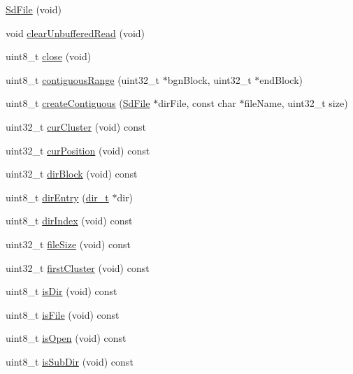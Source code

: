\begin{DoxyCompactItemize}
\item 
\hyperlink{class_sd_file_a9e08675e64a4ef847700876d4291bbef}{Sd\+File} (void)
\item 
void \hyperlink{class_sd_file_a44c3d6ef602e84b8160a4d215faef7d4}{clear\+Unbuffered\+Read} (void)
\item 
uint8\+\_\+t \hyperlink{class_sd_file_a6b24350c89cc41ff644a343231a3983c}{close} (void)
\item 
uint8\+\_\+t \hyperlink{class_sd_file_a3b07fc09dbcb28ae7c89c060af6a1810}{contiguous\+Range} (uint32\+\_\+t $\ast$bgn\+Block, uint32\+\_\+t $\ast$end\+Block)
\item 
uint8\+\_\+t \hyperlink{class_sd_file_a07fc5c82318f073848e706f95830e5b5}{create\+Contiguous} (\hyperlink{class_sd_file}{Sd\+File} $\ast$dir\+File, const char $\ast$file\+Name, uint32\+\_\+t size)
\item 
uint32\+\_\+t \hyperlink{class_sd_file_a970ef8d6cbb09ccb104fe1156d4a0a9e}{cur\+Cluster} (void) const
\item 
uint32\+\_\+t \hyperlink{class_sd_file_a6105ae2f1c23e99fdea17bc64571ea8c}{cur\+Position} (void) const
\item 
uint32\+\_\+t \hyperlink{class_sd_file_af62898865cfe9a97ce75468efc0d2409}{dir\+Block} (void) const
\item 
uint8\+\_\+t \hyperlink{class_sd_file_abaf9b1dc12d53cdeb937065edf68927d}{dir\+Entry} (\hyperlink{_fat_structs_8h_a803db59d4e16a0c54a647afc6a7954e3}{dir\+\_\+t} $\ast$dir)
\item 
uint8\+\_\+t \hyperlink{class_sd_file_ad4381e541a53a7e5cf51a866c1c8f79e}{dir\+Index} (void) const
\item 
uint32\+\_\+t \hyperlink{class_sd_file_add58372b89c922511bc425d84b07dc5f}{file\+Size} (void) const
\item 
uint32\+\_\+t \hyperlink{class_sd_file_a854b7555bd774ff668558bf919636edd}{first\+Cluster} (void) const
\item 
uint8\+\_\+t \hyperlink{class_sd_file_a564e69a08c11f20e66eb18c38e24b748}{is\+Dir} (void) const
\item 
uint8\+\_\+t \hyperlink{class_sd_file_ad9ca9b2b519a933c25e8f893ee0201b6}{is\+File} (void) const
\item 
uint8\+\_\+t \hyperlink{class_sd_file_a54e1b9385c43c33dc83eaad6de0d33be}{is\+Open} (void) const
\item 
uint8\+\_\+t \hyperlink{class_sd_file_a22fb79f645f5a92baf699d547395667b}{is\+Sub\+Dir} (void) const
\item 

\end{DoxyCompactItemize}
